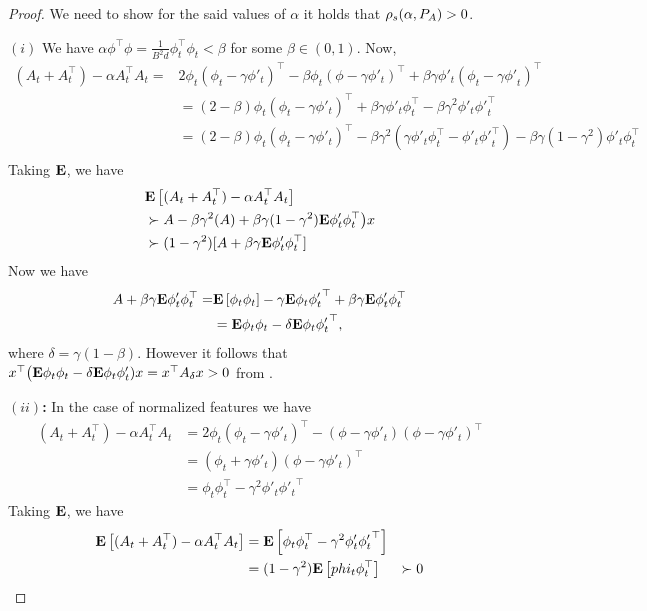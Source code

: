 \thtdadmis*
\begin{proof}
We need to show for the said values of $\alpha$ it holds that $\rho_s(\alpha,P_A)>0$. %

\textbf{$(i)$}   We have $\alpha\phi^\top\phi=\frac{1}{B^2d}\phi^\top_t\phi_t<\beta$ for some $\beta\in (0,1)$. Now, 
\begin{align*}
(A_t+A_t^\top) -\alpha A_t^\top A_t =& 2\phi_t(\phi_t-\gamma\phi'_t)^\top -\beta\phi_t(\phi-\gamma\phi'_t)^\top+\beta\gamma\phi'_t(\phi_t-\gamma{\phi'}_t)^\top\\
&= (2-\beta)\phi_t(\phi_t-\gamma\phi'_t)^\top +\beta\gamma\phi'_t\phi^\top_t-\beta\gamma^2\phi'_t{\phi'}_t^\top \\
&= (2-\beta)\phi_t(\phi_t-\gamma\phi'_t)^\top -\beta\gamma^2(\gamma\phi'_t\phi^\top_t- \phi'_t{\phi'}_t^\top)-\beta\gamma(1-\gamma^2)\phi'_t\phi_t^\top\\
\end{align*}
Taking $\mathbf{E}$, we have
\begin{align*}
&\mathbf{E}\left[ (A_t+A_t^\top)-\alpha A_t^\top A_t\right]\\
&\succ  A -\beta\gamma^2(A)+\beta\gamma(1-\gamma^2)\mathbf{E}{\phi'_t\phi_t^\top} \big)x\\
&\succ (1-\gamma^2)[A +\beta\gamma\mathbf{E}{\phi'_t\phi_t^\top}]
\end{align*}
Now we have 
\begin{align*}
A +\beta\gamma\mathbf{E}{\phi'_t\phi_t^\top}=& \mathbf{E}\left[\phi_t\phi_t\right]-\gamma\mathbf{E}{\phi_t{\phi'_t}^\top} +\beta\gamma\mathbf{E}{\phi'_t\phi_t^\top}\\
&=\mathbf{E}{\phi_t\phi_t}-\delta\mathbf{E}{\phi_t{\phi'_t}^\top},
\end{align*}
where $\delta=\gamma(1-\beta)$. However it follows that $x^\top\big(\mathbf{E}{\phi_t\phi_t}-\delta\mathbf{E}{\phi_t\phi'_t} )x=x^\top A_{\delta} x>0$ from .

\textbf{$(ii)$:}
In the case of normalized features we have
\begin{align*}
(A_t+A_t^\top) -\alpha A_t^\top A_t &= 2\phi_t(\phi_t-\gamma\phi'_t)^\top - (\phi-\gamma\phi'_t)(\phi-\gamma\phi'_t)^\top\\
&=(\phi_t+\gamma\phi'_t)(\phi-\gamma\phi'_t)^\top\\
&=\phi_t\phi_t^\top-\gamma^2\phi'_t{\phi'_t}^\top
\end{align*}
Taking $\mathbf{E}$, we have
\begin{align*}
\mathbf{E}\left[(A_t+A_t^\top) -\alpha A_t^\top A_t \right]&=\mathbf{E}\left[\phi_t\phi_t^\top-\gamma^2\phi'_t{\phi'_t}^\top\right]\\
&=(1-\gamma^2)\mathbf{E}\left[phi_t\phi_t^\top\right]
&\succ 0
\end{align*}


\end{proof}
